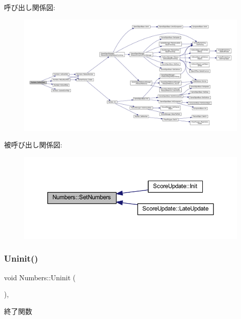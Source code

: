 呼び出し関係図\+:\nopagebreak
\begin{figure}[H]
\begin{center}
\leavevmode
\includegraphics[width=350pt]{class_numbers_aeb51ecf4e148f4ca67ac7788e061f94d_cgraph}
\end{center}
\end{figure}
被呼び出し関係図\+:\nopagebreak
\begin{figure}[H]
\begin{center}
\leavevmode
\includegraphics[width=350pt]{class_numbers_aeb51ecf4e148f4ca67ac7788e061f94d_icgraph}
\end{center}
\end{figure}
\mbox{\label{class_numbers_aeaad3cc1b8ae7defe79813b983b04101}} 
\subsubsection{\texorpdfstring{Uninit()}{Uninit()}}
{\footnotesize\ttfamily void Numbers\+::\+Uninit (\begin{DoxyParamCaption}{ }\end{DoxyParamCaption})\hspace{0.3cm}{\ttfamily [override]}, {\ttfamily [virtual]}}



終了関数 



